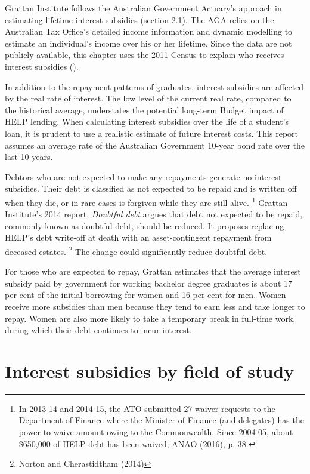 \documentclass[embargoed]{grattan}
\begin{document}
Grattan Institute follows the Australian Government Actuary's approach in estimating lifetime interest subsidies (section 2.1).
The \gls{AGA} relies on the Australian Tax Office's detailed income information and dynamic modelling to estimate an individual's income over his or her lifetime.
Since the data are not publicly available, this chapter uses the 2011 Census to explain who receives interest subsidies ().

In addition to the repayment patterns of graduates, interest subsidies are affected by the real rate of interest.
The low level of the current real rate, compared to the historical average, understates the potential long-term Budget impact of \gls{HELP} lending.
When calculating interest subsidies over the life of a student's loan, it is prudent to use a realistic estimate of future interest costs.
This report assumes an average rate of the Australian Government 10-year bond rate over the last 10 years.


Debtors who are not expected to make any repayments generate no interest subsidies.
Their debt is classified as not expected to be repaid and is written off when they die, or in rare cases is forgiven while they are still alive.%
\footnote{In 2013-14 and 2014-15, the \gls{ATO} submitted 27 waiver requests to the Department of Finance where the Minister of Finance (and delegates) has the power to waive amount owing to the Commonwealth.
Since 2004-05, about \$650,000 of \gls{HELP} debt has been waived; ANAO (2016), p. 38.} Grattan Institute's 2014 report, \emph{Doubtful debt} argues that debt not expected to be repaid, commonly known as doubtful debt, should be reduced.
It proposes replacing \gls{HELP}'s debt write-off at death with an asset-contingent repayment from deceased estates.%
\footnote{Norton and Cherastidtham (2014)} The change could significantly reduce doubtful debt.

For those who are expected to repay, Grattan estimates that the average interest subsidy paid by government for working bachelor degree graduates is about 17 per cent of the initial borrowing for women and 16 per cent for men.
Women receive more subsidies than men because they tend to earn less and take longer to repay.
Women are also more likely to take a temporary break in full-time work, during which their debt continues to incur interest.

\section{Interest subsidies by field of study}\label{interest-subsidies-by-field-of-study}
\end{document}
